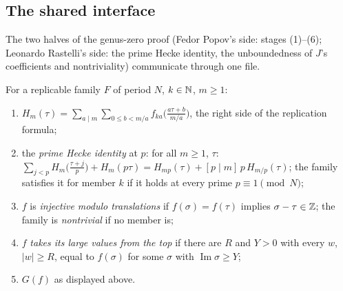 \subsection{The shared interface}

The two halves of the genus-zero proof (Fedor Popov's side: stages (1)--(6); Leonardo Rastelli's side: the prime Hecke
identity, the unboundedness of $J$'s coefficients and nontriviality) communicate through one file.

\begin{definition}\label{ch19:def:interface}
For a replicable family $F$ of period $N$, $k\in{\mathbb{N}}$, $m\ge1$:
\begin{enumerate}[label=(\alph*)]
\item $H_m(\tau)=\sum_{a\mid m}\sum_{0\le b<m/a}f_{ka}\bigl(\frac{a\tau+b}{m/a}\bigr)$, the right side of the replication formula;
\item the \emph{prime Hecke identity} at $p$: for all $m\ge1$, $\tau$:
  $\sum_{j<p}H_m\bigl(\frac{\tau+j}p\bigr)+H_m(p\tau)=H_{mp}(\tau)+[p\mid m]\,p\,H_{m/p}(\tau)$; the family satisfies it for member $k$
  if it holds at every prime $p\equiv1\pmod N$;
\item $f$ is \emph{injective modulo translations} if $f(\sigma)=f(\tau)$ implies $\sigma-\tau\in{\mathbb{Z}}$; the family is
  \emph{nontrivial} if no member is;
\item $f$ \emph{takes its large values from the top} if there are $R$ and $Y>0$ with every $w$, $|w|\ge R$, equal to $f(\sigma)$ for
  some $\sigma$ with $\operatorname{Im}\sigma\ge Y$;
\item $G(f)$ as displayed above.
\end{enumerate}
\end{definition}
